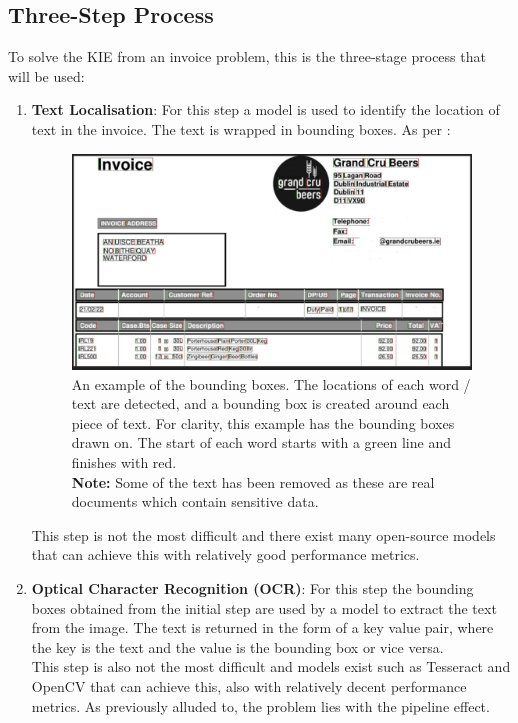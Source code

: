 \subsection{Three-Step Process}
To solve the KIE from an invoice problem, this is the three-stage process that will be used:
\begin{enumerate}
	\item \textbf{Text Localisation}: For this step a model is used to identify the location of text in the invoice. The text is
	      wrapped in bounding boxes. As per :
	      \begin{figure}[H]
		      \centering
		      \includegraphics[width=0.8\linewidth]{figures/bounding_box_partial.png}
		      \caption[Bounding Box Example]{An example of the bounding boxes. The locations of each word / text are detected, and a bounding box is created
			      around each piece of text. For clarity, this example has the bounding boxes drawn on. The start of each word starts with a green line and finishes with red.\\
			      \textbf{Note:} Some of the text has been removed as these are real documents which contain sensitive data.}
		      \label{fig:bounding_box_partial}
	      \end{figure}
	      This step is not the most difficult and there exist many open-source models that can achieve this with relatively good performance metrics.
	\item \textbf{Optical Character Recognition (OCR)}: For this step the bounding boxes obtained from the initial step are used by a model to extract
	      the text from the image. The text is returned in the form of a key value pair, where the key is the text and the value is the bounding box or vice versa.\\
	      This step is also not the most difficult and models exist such as Tesseract and OpenCV that can achieve this, also with relatively decent performance
	      metrics. As previously alluded to, the problem lies with the pipeline effect.

\end{enumerate}
